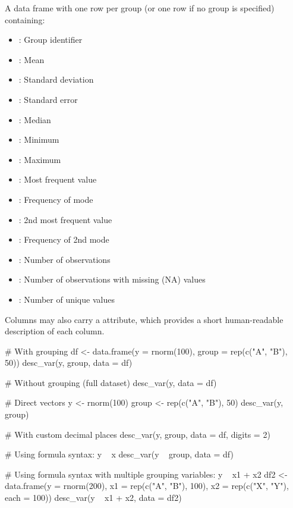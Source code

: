 \documentclass[a4paper]{book}
\begin{document}
%
\begin{Value}
A data frame with one row per group (or one row if no group is specified) containing:
\begin{itemize}

\item{} : Group identifier
\item{} : Mean
\item{} : Standard deviation
\item{} : Standard error
\item{} : Median
\item{} : Minimum
\item{} : Maximum
\item{} : Most frequent value
\item{} : Frequency of mode
\item{} : 2nd most frequent value
\item{} : Frequency of 2nd mode
\item{} : Number of observations
\item{} : Number of observations with missing (NA) values
\item{} : Number of unique values

\end{itemize}

Columns may also carry a  attribute, which provides a short
human-readable description of each column.
\end{Value}
%
\begin{Examples}
\begin{ExampleCode}
# With grouping
df <- data.frame(y = rnorm(100), group = rep(c("A", "B"), 50))
desc_var(y, group, data = df)

# Without grouping (full dataset)
desc_var(y, data = df)

# Direct vectors
y <- rnorm(100)
group <- rep(c("A", "B"), 50)
desc_var(y, group)

# With custom decimal places
desc_var(y, group, data = df, digits = 2)

# Using formula syntax: y ~ x
desc_var(y ~ group, data = df)

# Using formula syntax with multiple grouping variables: y ~ x1 + x2
df2 <- data.frame(y = rnorm(200), x1 = rep(c("A", "B"), 100), x2 = rep(c("X", "Y"), each = 100))
desc_var(y ~ x1 + x2, data = df2)

\end{ExampleCode}
\end{Examples}
\end{document}
